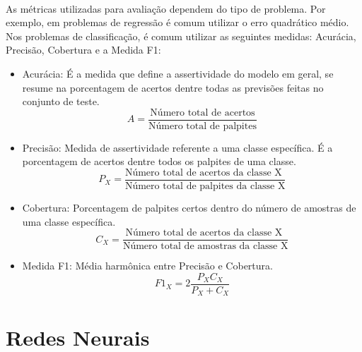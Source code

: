 \documentclass[grad,numbers]{coppe}
\begin{document}
				\paragraph{}As métricas utilizadas para avaliação dependem do tipo de problema. Por exemplo, em problemas de regressão é comum utilizar o erro quadrático médio\cite{regression-loss}. Nos problemas de classificação, é comum utilizar as seguintes medidas: Acurácia, Precisão, Cobertura e a Medida F1:
				\begin{itemize}
					\item Acurácia: É a medida que define a assertividade do modelo em geral, se resume na porcentagem de acertos dentre todas as previsões feitas no conjunto de teste.
					\begin{equation*}
						A = \frac{\text{Número total de acertos}}{\text{Número total de palpites}}
					\end{equation*}
					\item Precisão: Medida de assertividade referente a uma classe específica. É a porcentagem de acertos dentre todos os palpites de uma classe.
					\begin{equation*}
						P_X = \frac{\text{Número total de acertos da classe X }}{\text{Número total de palpites da classe X}}
					\end{equation*}
					\item Cobertura: Porcentagem de palpites certos dentro do número de amostras de uma classe específica.
					\begin{equation*}
						C_X = \frac{\text{Número total de acertos da classe X }}{\text{Número total de amostras da classe X}}
					\end{equation*}
					\item  Medida F1: Média harmônica entre Precisão e Cobertura.
						\begin{equation*}
						F1_X = 2\frac{P_X C_X}{P_X + C_X}
						\end{equation*}
				\end{itemize}
  
  \section{Redes Neurais}
\end{document}

